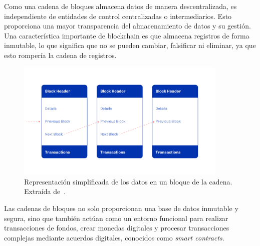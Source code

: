 \documentclass[12pt]{book}
\begin{document}
Como una cadena de bloques almacena datos de manera descentralizada, es independiente de entidades de control centralizadas o intermediarios. Esto proporciona una mayor transparencia del almacenamiento de datos y su gestión. Una característica importante de blockchain es que almacena registros de forma inmutable, lo que significa que no se pueden cambiar, falsificar ni eliminar, ya que esto rompería la cadena de registros.

\begin{figure}
	\centering
	\includegraphics[width=0.9\textwidth]{Bloques.png}
	\caption{Representación simplificada de los datos en un bloque de la cadena. Extraída de~\cite{plutus-smart-contracts}.}\label{fig:Bloques}
\end{figure}

Las cadenas de bloques no solo proporcionan una base de datos inmutable y segura, sino que también actúan como un entorno funcional para realizar transacciones de fondos, crear monedas digitales y procesar transacciones complejas mediante acuerdos digitales, conocidos como \textit{smart contracts}.


\end{document}
